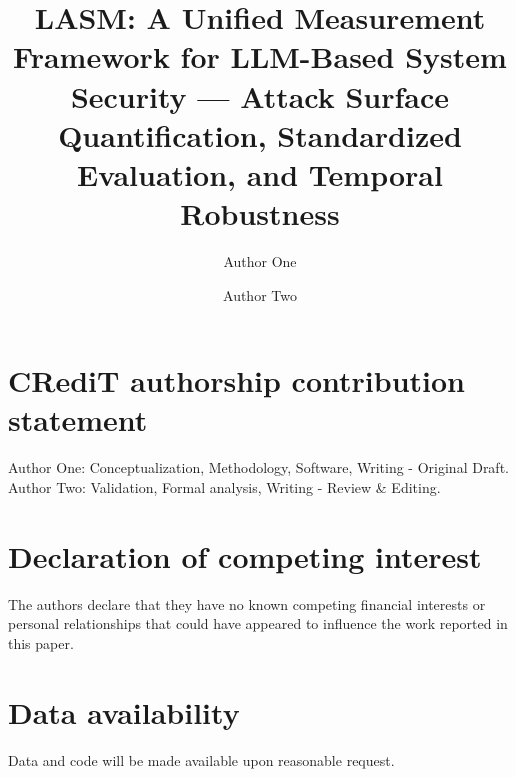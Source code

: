 \documentclass[review]{elsarticle}
\begin{document}
\begin{frontmatter}

\title{LASM: A Unified Measurement Framework for LLM-Based System Security — Attack Surface Quantification, Standardized Evaluation, and Temporal Robustness}

\author[1]{Author One}
\author[1]{Author Two}

\address[1]{Institution Name, Address, City, Country}




\end{frontmatter}

\linenumbers








\section*{CRediT authorship contribution statement}
Author One: Conceptualization, Methodology, Software, Writing - Original Draft.
Author Two: Validation, Formal analysis, Writing - Review \& Editing.

\section*{Declaration of competing interest}
The authors declare that they have no known competing financial interests or personal relationships that could have appeared to influence the work reported in this paper.

\section*{Data availability}
Data and code will be made available upon reasonable request.


\end{document}
